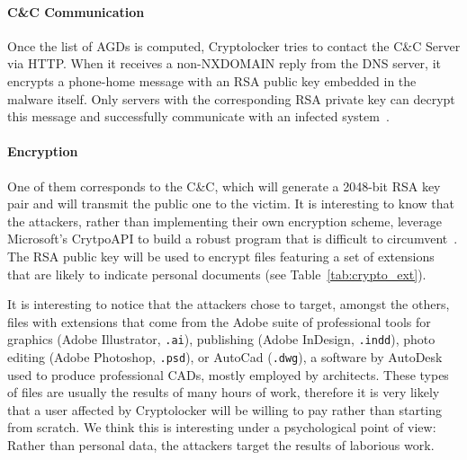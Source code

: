 \paragraph{C\&C Communication} Once the list of AGDs is computed, Cryptolocker
tries to contact the C\&C Server via HTTP. When it receives a non-NXDOMAIN
reply from the DNS server, it encrypts a phone-home message with an RSA
public key embedded in the malware itself. Only servers with the corresponding
RSA private key can decrypt this message and successfully communicate with an
infected system~\cite{dell2013}.

\paragraph{Encryption} One of them corresponds to the C\&C, which will generate a 2048-bit RSA key
pair and will transmit the public one to
the victim. It is interesting to know that the attackers, rather than
implementing their own encryption scheme, leverage Microsoft's CrytpoAPI to
build a robust program that is difficult to circumvent~\cite{dell2013}.
The RSA public key will be used to encrypt files featuring a set of extensions
that are likely to indicate personal documents (see Table~\ref{tab:crypto_ext}).

It is interesting to notice that the attackers chose to target, amongst the
others, files with extensions that come from the Adobe suite of professional
tools for graphics (Adobe Illustrator, \texttt{.ai}), publishing (Adobe InDesign, \texttt{.indd}), photo editing (Adobe Photoshop, \texttt{.psd}), or
AutoCad (\texttt{.dwg}), a software by AutoDesk used to produce professional CADs,
mostly employed by architects. These types of files are usually the results
of many hours of work, therefore it is very likely that a user affected by
Cryptolocker will be willing to pay rather than starting from scratch. We think
this is interesting under a psychological point of view: Rather than personal
data, the attackers target the results of laborious work.

